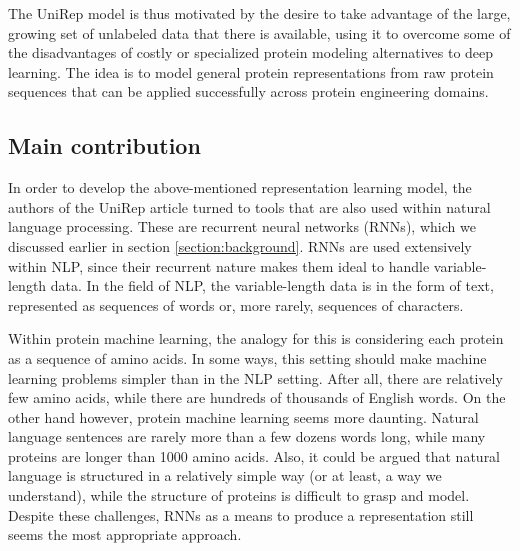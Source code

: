 \documentclass[a4paper,12pt]{article}
\begin{document}
The UniRep model is thus motivated by the desire to take advantage of the large, growing set of unlabeled data that there is available, using it to overcome some of the disadvantages of costly or specialized protein modeling alternatives to deep learning. The idea is to model general protein representations from raw protein sequences that can be applied successfully across protein engineering domains.

\subsection{Main contribution}
In order to develop the above-mentioned representation learning model, the authors of the UniRep article turned to tools that are also used within natural language processing. These are recurrent neural networks (RNNs), which we discussed earlier in section \ref{section:background}. RNNs are used extensively within NLP, since their recurrent nature makes them ideal to handle variable-length data. In the field of NLP, the variable-length data is in the form of text, represented as sequences of words or, more rarely, sequences of characters.

Within protein machine learning, the analogy for this is considering each protein as a sequence of amino acids. In some ways, this setting should make machine learning problems simpler than in the NLP setting. After all, there are relatively few amino acids, while there are hundreds of thousands of English words. On the other hand however, protein machine learning seems more daunting. Natural language sentences are rarely more than a few dozens words long, while many proteins are longer than 1000 amino acids. Also, it could be argued that natural language is structured in a relatively simple way (or at least, a way we understand), while the structure of proteins is difficult to grasp and model. Despite these challenges, RNNs as a means to produce a representation still seems the most appropriate approach.
\end{document}
